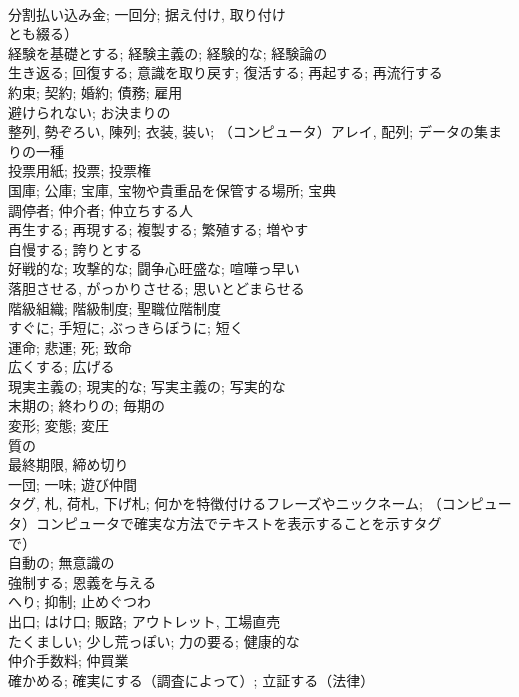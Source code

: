 \documentclass[8pt]{extreport}
\begin{document}
\begin{CJK}{UTF8}{min}
\\	分割払い込み金; 一回分; 据え付け, 取り付け
\\	とも綴る）	
\\	経験を基礎とする; 経験主義の; 経験的な; 経験論の	
\\	生き返る; 回復する; 意識を取り戻す; 復活する; 再起する; 再流行する	
\\	約束; 契約; 婚約; 債務; 雇用	
\\	避けられない; お決まりの	
\\	整列, 勢ぞろい, 陳列; 衣装, 装い; （コンピュータ）アレイ, 配列; データの集まりの一種	
\\	投票用紙; 投票; 投票権	
\\	国庫; 公庫; 宝庫, 宝物や貴重品を保管する場所; 宝典	
\\	調停者; 仲介者; 仲立ちする人
\\	再生する; 再現する; 複製する; 繁殖する; 増やす	
\\	自慢する; 誇りとする	
\\	好戦的な; 攻撃的な; 闘争心旺盛な; 喧嘩っ早い	
\\	落胆させる, がっかりさせる; 思いとどまらせる	
\\	階級組織; 階級制度; 聖職位階制度	
\\	すぐに; 手短に; ぶっきらぼうに; 短く	
\\	運命; 悲運; 死; 致命	
\\	広くする; 広げる	
\\	現実主義の; 現実的な; 写実主義の; 写実的な	
\\	末期の; 終わりの; 毎期の	
\\	変形; 変態; 変圧	
\\	質の
\\	最終期限, 締め切り	
\\	一団; 一味; 遊び仲間	
\\	タグ, 札, 荷札, 下げ札; 何かを特徴付けるフレーズやニックネーム; （コンピュータ）コンピュータで確実な方法でテキストを表示することを示すタグ
\\	で）	
\\	自動の; 無意識の	
\\	強制する; 恩義を与える	
\\	へり; 抑制; 止めぐつわ	
\\	出口; はけ口; 販路; アウトレット, 工場直売	
\\	たくましい; 少し荒っぽい; 力の要る; 健康的な	
\\	仲介手数料; 仲買業	
\\	確かめる; 確実にする（調査によって）; 立証する（法律）	

\end{CJK}
\end{document}
